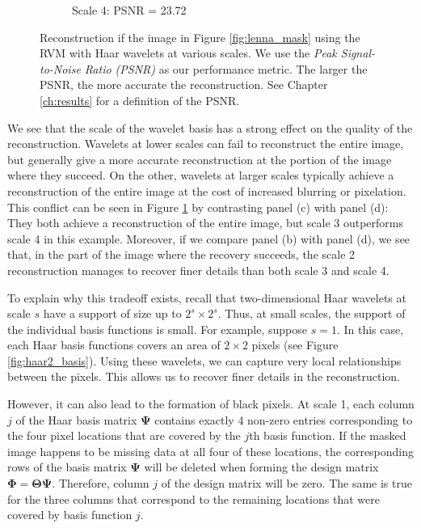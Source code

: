 \begin{figure}
\begin{subfigure}{0.4\textwidth}
    \caption{Scale 4: PSNR = 23.72}
  \end{subfigure}  
  \caption[Reconstruction of masked image signals using Haar wavelets at various scales]{Reconstruction if the image in Figure \ref{fig:lenna_mask} using the RVM with Haar wavelets at various scales.
    We use the \emph{Peak Signal-to-Noise Ratio (PSNR)} as our performance metric. The larger the PSNR, the more accurate the reconstruction. See Chapter \ref{ch:results} for a definition of the PSNR.}
  \label{fig:lenna_rvm}
\end{figure}

We see that the scale of the wavelet basis has a strong effect on the quality of the reconstruction.
Wavelets at lower scales can fail to reconstruct the entire image, but generally give a more accurate reconstruction at the portion of the image where they succeed.
On the other, wavelets at larger scales typically achieve a reconstruction of the entire image at the cost of increased blurring or pixelation.
This conflict can be seen in Figure \ref{fig:lenna_rvm} by contrasting panel (c) with panel (d):
They both achieve a reconstruction of the entire image, but scale 3 outperforms scale 4 in this example.
Moreover, if we compare panel (b) with panel (d), we see that, in the part of the image where the recovery succeeds, the scale 2 reconstruction manages to recover finer details than both scale 3 and scale 4.

To explain why this tradeoff exists, recall that two-dimensional Haar wavelets at scale $s$ have a support of size up to $2^s\times 2^s$.
Thus, at small scales, the support of the individual basis functions is small.
For example, suppose $s=1$.
In this case, each Haar basis functions covers an area of $2\times 2$ pixels (see Figure \ref{fig:haar2_basis}).
Using these wavelets, we can capture very local relationships between the pixels.
This allows us to recover finer details in the reconstruction.

However, it can also lead to the formation of black pixels.
At scale 1, each column $j$ of the Haar basis matrix $\bm \Psi$ contains exactly 4 non-zero entries corresponding to the four pixel locations that are covered by the $j$th basis function.
If the masked image happens to be missing data at all four of these locations, the corresponding rows of the basis matrix $\bm\Psi$ will be deleted when forming the design matrix $\bm\Phi=\bm\Theta\bm\Psi$.
Therefore, column $j$ of the design matrix will be zero.
The same is true for the three columns that correspond to the remaining locations that were covered by basis function $j$.

